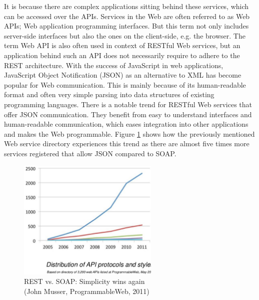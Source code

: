 It is because there are complex applications sitting behind these services, which can be accessed over the \textrm{APIs}.
Services in the Web are often referred to as \textrm{Web APIs}; Web application programming interfaces.
But this term not only includes server-side interfaces but also the ones on the client-side, e.g. the browser.
The term \textrm{Web API} is also often used in context of \textrm{RESTful} Web services, but an application behind such an \textrm{API} does not necessarily require to adhere to the \textrm{REST} architecture.
With the success of JavaScript in web applications, JavaScript Object Notification (\textrm{JSON}) as an alternative to \textrm{XML} has become popular for Web communication.
This is mainly because of its human-readable format and often very simple parsing into data structures of existing programming languages.
There is a notable trend for \textrm{RESTful} Web services that offer \textrm{JSON} communication.
They benefit from easy to understand interfaces and human-readable communication, which eases integration into other applications and makes the Web programmable.
Figure \ref{fig:slide-11-1024} shows how the previously mentioned Web service directory experiences this trend as there are almost five times more services registered that allow \textrm{JSON} compared to \textrm{SOAP}.
\begin{figure}[!ht]
  \centering
  \includegraphics[width=0.6\textwidth]{figures/slide-11-1024}
  \caption{REST vs. SOAP: Simplicity wins again\\(John Musser, ProgrammableWeb, 2011)}
  \label{fig:slide-11-1024}
\end{figure}



